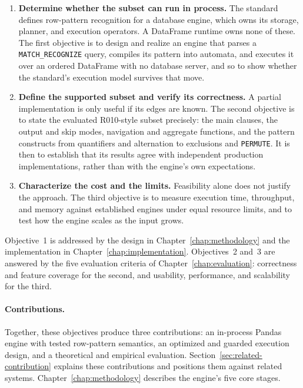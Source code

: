 \begin{enumerate}
  \item \textbf{Determine whether the subset can run in process.}
    The standard defines row-pattern recognition for a database engine, which
    owns its storage, planner, and execution operators.  A DataFrame runtime
    owns none of these.  The first objective is to design and realize an
    engine that parses a \texttt{MATCH\_RECOGNIZE} query, compiles its pattern
    into automata, and executes it over an ordered DataFrame with no database
    server, and so to show whether the standard's execution model survives
    that move.

  \item \textbf{Define the supported subset and verify its correctness.}
    A partial implementation is only useful if its edges are known.  The
    second objective is to state the evaluated R010-style subset precisely: the
    main clauses, the output and skip modes, navigation and aggregate
    functions, and the pattern constructs from quantifiers and alternation to
    exclusions and \texttt{PERMUTE}.  It is then to establish that its results
    agree with independent production implementations, rather than with the
    engine's own expectations.

  \item \textbf{Characterize the cost and the limits.}
    Feasibility alone does not justify the approach.  The third objective is
    to measure execution time, throughput, and memory against established
    engines under equal resource limits, and to test how the engine scales as
    the input grows.
\end{enumerate}

Objective~1 is addressed by the design in Chapter~\ref{chap:methodology} and
the implementation in Chapter~\ref{chap:implementation}.  Objectives~2
and~3 are answered by the five evaluation criteria of
Chapter~\ref{chap:evaluation}: correctness and feature coverage for the
second, and usability, performance, and scalability for the third.

\paragraph{Contributions.}
Together, these objectives produce three contributions: an in-process
Pandas engine with tested row-pattern semantics, an optimized and guarded
execution design, and a theoretical and empirical evaluation.
Section~\ref{sec:related-contribution} explains these contributions and
positions them against related systems.  Chapter~\ref{chap:methodology}
describes the engine's five core stages.

